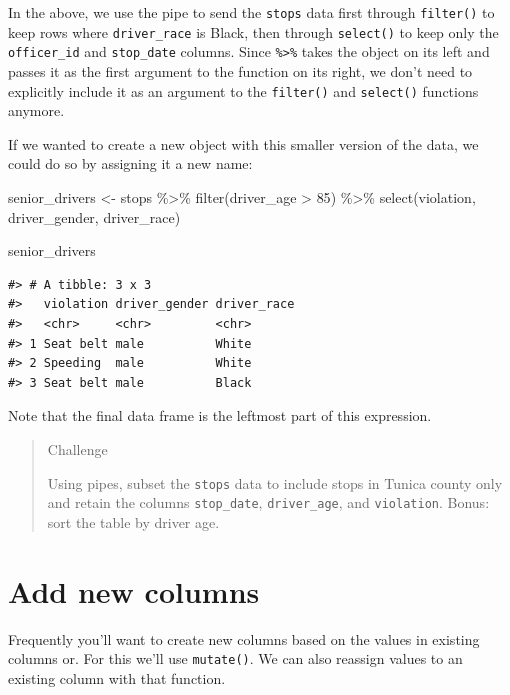 \documentclass[
]{book}
\newenvironment{Shaded}{\begin{snugshade}}{\end{snugshade}}
\newcommand{\DecValTok}[1]{\textcolor[rgb]{0.00,0.00,0.81}{#1}}
\newcommand{\FunctionTok}[1]{\textcolor[rgb]{0.00,0.00,0.00}{#1}}
\newcommand{\NormalTok}[1]{#1}
\newcommand{\OtherTok}[1]{\textcolor[rgb]{0.56,0.35,0.01}{#1}}
\newcommand{\SpecialCharTok}[1]{\textcolor[rgb]{0.00,0.00,0.00}{#1}}
\begin{document}
In the above, we use the pipe to send the \texttt{stops} data first through
\texttt{filter()} to keep rows where \texttt{driver\_race} is Black, then through \texttt{select()}
to keep only the \texttt{officer\_id} and \texttt{stop\_date} columns. Since \texttt{\%\textgreater{}\%} takes
the object on its left and passes it as the first argument to the function on
its right, we don't need to explicitly include it as an argument to the
\texttt{filter()} and \texttt{select()} functions anymore.

If we wanted to create a new object with this smaller version of the data, we
could do so by assigning it a new name:

\begin{Shaded}
\begin{Highlighting}[]
\NormalTok{senior\_drivers }\OtherTok{\textless{}{-}}\NormalTok{ stops }\SpecialCharTok{\%\textgreater{}\%}
  \FunctionTok{filter}\NormalTok{(driver\_age }\SpecialCharTok{\textgreater{}} \DecValTok{85}\NormalTok{) }\SpecialCharTok{\%\textgreater{}\%}
  \FunctionTok{select}\NormalTok{(violation, driver\_gender, driver\_race)}

\NormalTok{senior\_drivers}
\end{Highlighting}
\end{Shaded}

\begin{verbatim}
#> # A tibble: 3 x 3
#>   violation driver_gender driver_race
#>   <chr>     <chr>         <chr>      
#> 1 Seat belt male          White      
#> 2 Speeding  male          White      
#> 3 Seat belt male          Black
\end{verbatim}

Note that the final data frame is the leftmost part of this expression.

\begin{quote}
Challenge

Using pipes, subset the \texttt{stops} data to include stops in Tunica county only and retain the columns \texttt{stop\_date}, \texttt{driver\_age}, and \texttt{violation}. Bonus: sort the table by driver age.
\end{quote}

\hypertarget{add-new-columns}{%
\section{Add new columns}\label{add-new-columns}}

Frequently you'll want to create new columns based on the values in existing columns or. For this we'll use \texttt{mutate()}. We can also reassign values to an existing column with that function.
\end{document}

